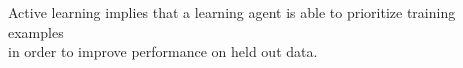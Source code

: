 \documentclass[preview]{standalone}
\begin{document}
\begin{center}
Active learning implies that a learning agent is able to prioritize training examples \\in order to improve performance on held out data.
\end{center}
\end{document}
